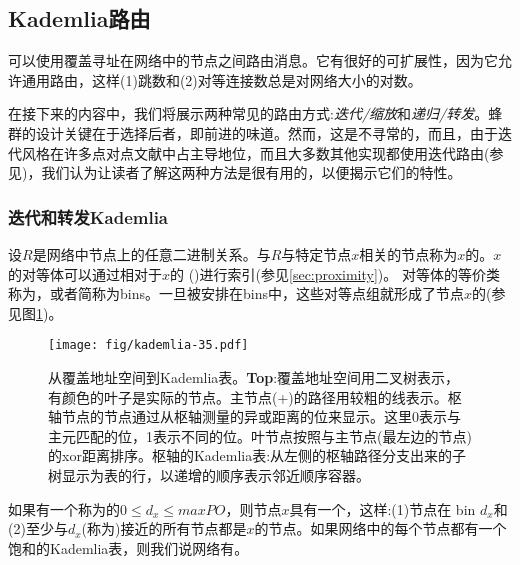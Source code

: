\subsection{Kademlia路由\statusgreen}\label{sec:kademlia-routing}

可以使用覆盖寻址在网络中的节点之间路由消息。它有很好的可扩展性，因为它允许通用路由，这样(1)跳数和(2)对等连接数总是对网络大小的对数。

在接下来的内容中，我们将展示两种常见的路由方式:\emph{迭代/缩放}和\emph{递归/转发}。蜂群的设计关键在于选择后者，即前进的味道。然而，这是不寻常的，而且，由于迭代风格在许多点对点文献中占主导地位，而且大多数其他实现都使用迭代路由(参见\cite{maymounkov2002kademlia,baumgart2007s,lua2005survey})，我们认为让读者了解这两种方法是很有用的，以便揭示它们的特性。

\subsubsection{迭代和转发Kademlia}

设$R$是网络中节点上的任意二进制关系。与$R$与特定节点$x$相关的节点称为$x$的。$x$的对等体可以通过相对于$x$的 ()进行索引(参见\ref{sec:proximity})。
对等体的等价类称为，或者简称为bins。一旦被安排在bins中，这些对等点组就形成了节点$x$的(参见图\ref{fig:kademlia-table})。 



\begin{figure}[htbp]
   \centering
    \texttt{[image: fig/kademlia-35.pdf]}
   \caption[从覆盖地址空间到Kademlia表\statusgreen]{从覆盖地址空间到Kademlia表。\textbf{Top}:覆盖地址空间用二叉树表示，有颜色的叶子是实际的节点。主节点(+)的路径用较粗的线表示。枢轴节点的节点通过从枢轴测量的异或距离的位来显示。这里0表示与主元匹配的位，1表示不同的位。叶节点按照与主节点(最左边的节点)的xor距离排序。枢轴的Kademlia表:从左侧的枢轴路径分支出来的子树显示为表的行，以递增的顺序表示邻近顺序容器。}
   \label{fig:kademlia-table}
\end{figure}

如果有一个称为的$0\leq d_x\leq \mathit{maxPO}$，则节点$x$具有一个，这样:(1)节点在 bin $d_x$和(2)至少与$d_x$(称为)接近的所有节点都是$x$的节点。如果网络中的每个节点都有一个饱和的Kademlia表，则我们说网络有。

